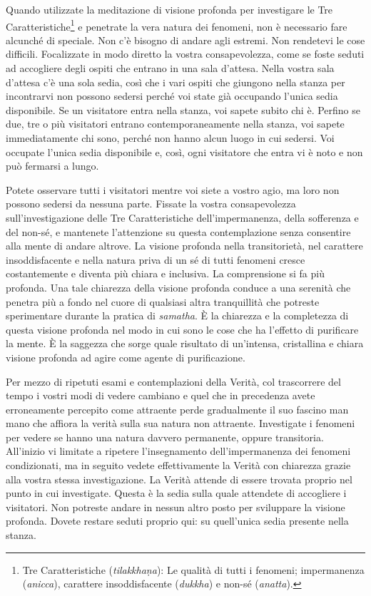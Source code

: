 Quando utilizzate la meditazione di visione profonda per investigare le
Tre Caratteristiche\footnote{Tre Caratteristiche (\emph{tilakkhaṇa}): Le
  qualità di tutti i fenomeni; impermanenza (\emph{anicca}), carattere
  insoddisfacente (\emph{dukkha}) e non-sé (\emph{anatta}).} e penetrate
la vera natura dei fenomeni, non è necessario fare alcunché di speciale.
Non c'è bisogno di andare agli estremi. Non rendetevi le cose difficili.
Focalizzate in modo diretto la vostra consapevolezza, come se foste
seduti ad accogliere degli ospiti che entrano in una sala d'attesa.
Nella vostra sala d'attesa c'è una sola sedia, così che i vari ospiti
che giungono nella stanza per incontrarvi non possono sedersi perché voi
state già occupando l'unica sedia disponibile. Se un visitatore entra
nella stanza, voi sapete subito chi è. Perfino se due, tre o più
visitatori entrano contemporaneamente nella stanza, voi sapete
immediatamente chi sono, perché non hanno alcun luogo in cui sedersi.
Voi occupate l'unica sedia disponibile e, così, ogni visitatore che
entra vi è noto e non può fermarsi a lungo.

Potete osservare tutti i visitatori mentre voi siete a vostro agio, ma
loro non possono sedersi da nessuna parte. Fissate la vostra
consapevolezza sull'investigazione delle Tre Caratteristiche
dell'impermanenza, della sofferenza e del non-sé, e mantenete
l'attenzione su questa contemplazione senza consentire alla mente di
andare altrove. La visione profonda nella transitorietà, nel carattere
insoddisfacente e nella natura priva di un sé di tutti fenomeni cresce
costantemente e diventa più chiara e inclusiva. La comprensione si fa
più profonda. Una tale chiarezza della visione profonda conduce a una
serenità che penetra più a fondo nel cuore di qualsiasi altra
tranquillità che potreste sperimentare durante la pratica di
\emph{samatha}. È la chiarezza e la completezza di questa visione
profonda nel modo in cui sono le cose che ha l'effetto di purificare la
mente. È la saggezza che sorge quale risultato di un'intensa,
cristallina e chiara visione profonda ad agire come agente di
purificazione.

Per mezzo di ripetuti esami e contemplazioni della Verità, col
trascorrere del tempo i vostri modi di vedere cambiano e quel che in
precedenza avete erroneamente percepito come attraente perde
gradualmente il suo fascino man mano che affiora la verità sulla sua
natura non attraente. Investigate i fenomeni per vedere se hanno una
natura davvero permanente, oppure transitoria. All'inizio vi limitate a
ripetere l'insegnamento dell'impermanenza dei fenomeni condizionati, ma
in seguito vedete effettivamente la Verità con chiarezza grazie alla
vostra stessa investigazione. La Verità attende di essere trovata
proprio nel punto in cui investigate. Questa è la sedia sulla quale
attendete di accogliere i visitatori. Non potreste andare in nessun
altro posto per sviluppare la visione profonda. Dovete restare seduti
proprio qui: su quell'unica sedia presente nella stanza.

